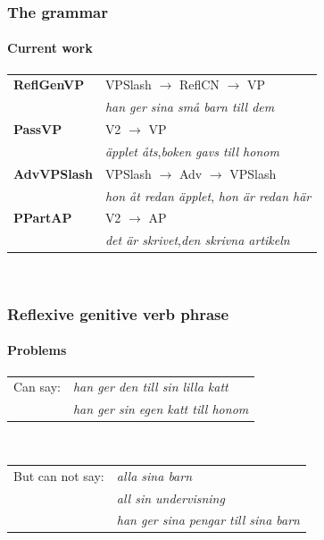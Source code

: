 \documentclass[10pt]{beamer}
\begin{document}
\begin{frame}
\frametitle{The grammar}
\framesubtitle{Current work} 
\begin{tabular}{ll}
\textbf{ReflGenVP} & VPSlash  $\rightarrow$ ReflCN $\rightarrow$ VP \\
& \emph{han ger sina små barn till dem} \\

\alert{\textbf{PassVP}}
  & \alert{V2 $\rightarrow$ VP} \\
& \alert{\emph{äpplet åts},}\alert{\emph{boken gavs till honom}} \\ 


\alert{\textbf{AdvVPSlash}} & \alert{VPSlash $\rightarrow$ Adv $\rightarrow$ VPSlash} \\
& \alert{\emph{hon åt redan äpplet}, \emph{hon är redan här}}\\

\alert{\textbf{PPartAP}} & \alert{V2 $\rightarrow$ AP} \\
& \alert{\emph{det är skrivet},\emph{den skrivna artikeln}}
\end{tabular}\\
  
\end{frame}

\begin{frame}[containsverbatim]
\frametitle{Reflexive genitive verb phrase}
\framesubtitle{Problems} 
\begin{tabular}{ll}
Can say:&  \emph{han ger den till sin lilla katt} \\
 &        \emph{han ger sin egen katt till honom} \\
\end{tabular} \\

\begin{tabular}{ll}
But can not say: & \emph{alla sina barn} \\
 & \emph{all sin undervisning} \\
 & \emph{han ger sina pengar till sina barn}
\end{tabular} \\

\end{frame}
\end{document}
